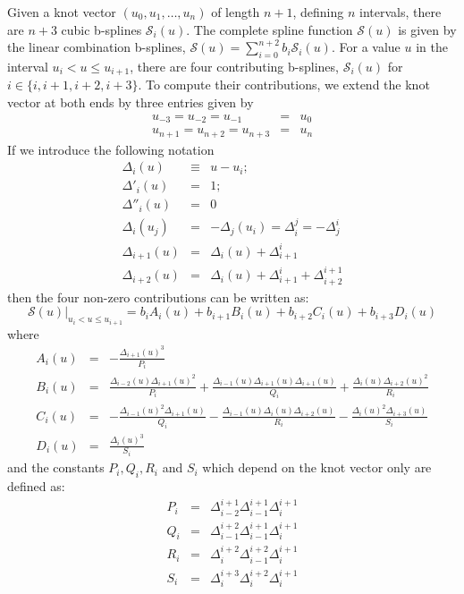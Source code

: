 \documentclass[a4paper,10pt,twosided]{article}
\begin{document}
Given a knot vector $(u_0,u_1,\dots,u_n)$ of length $n+1$, defining $n$ intervals, there are $n+3$ cubic b-splines $\mathcal{S}_i(u)$.
The complete spline function $\mathcal{S}(u)$ is given by the linear combination b-splines, $\mathcal{S}(u)= \sum_{i=0}^{n+2} b_i  \mathcal{S}_i(u)$.
For a value $u$ in the interval $u_{i}<  u\le u_{i+1}$, there are four contributing b-splines, $\mathcal{S}_i(u)$ for $i\in \{i,i+1,i+2,i+3\}$.
To compute their contributions, we extend the knot vector at both ends by three entries given by  
\begin{eqnarray*}
   u_{-3}=u_{-2}=u_{-1}&=&u_0
\\ u_{n+1}=u_{n+2}=u_{n+3}&=&u_n
\end{eqnarray*}
If we introduce the following notation
\begin{eqnarray*}
       \Delta_i(u) &\equiv& u-u_i;
   \\  \Delta'_i(u) &=& 1;
   \\  \Delta''_i(u)&=&0
   \\  \Delta_{i}(u_j) &=& -\Delta_j(u_i) = \Delta_i^j = -\Delta_j^i
   \\  \Delta_{i+1}(u) &=& \Delta_i(u)+\Delta_{i+1}^i
   \\  \Delta_{i+2}(u) &=& \Delta_i(u)+\Delta_{i+1}^i +\Delta_{i+2}^{i+1} 
\end{eqnarray*}
then the  four non-zero contributions can be written as:
\begin{equation}
   \left. \mathcal{S}(u)\right|_{u_i<u\le u_{i+1}} = b_i A_i(u) + b_{i+1} B_i(u) + b_{i+2} C_i(u) + b_{i+3} D_i(u)
\end{equation}
where
\begin{eqnarray*}
     A_i(u) &=& -\frac{\Delta_{i+1}(u)^3}{P_i}  
\\   B_i(u) &=&  \frac{\Delta_{i-2}(u)\Delta_{i+1}(u)^2 }{P_i} + \frac{ \Delta_{i-1}(u)\Delta_{i+1}(u)\Delta_{i+1}(u) }{Q_i} + \frac{ \Delta_i(u)\Delta_{i+2}(u)^2 }{R_i}
\\   C_i(u) &=& -\frac{\Delta_{i-1}(u)^2\Delta_{i+1}(u) }{Q_i} - \frac{ \Delta_{i-1}(u)\Delta_i(u)\Delta_{i+2}(u) }{R_i} - \frac{ \Delta_i(u)^2\Delta_{i+3}(u) }{S_i}
\\   D_i(u) &=&  \frac{\Delta_i(u)^3 }{S_i}
\end{eqnarray*}
and the constants $P_i,Q_i,R_i$ and $S_i$ which depend on the knot vector only are defined as:
\begin{eqnarray*}
    P_i &=&\Delta_{i-2}^{i+1}\Delta_{i-1}^{i+1}\Delta_i^{i+1}
\\  Q_i &=&\Delta_{i-1}^{i+2}\Delta_{i-1}^{i+1}\Delta_i^{i+1}
\\  R_i &=&\Delta_i^{i+2}\Delta_{i-1}^{i+2}\Delta_i^{i+1}
\\  S_i &=&\Delta_i^{i+3}\Delta_i^{i+2}\Delta_i^{i+1}
\end{eqnarray*}
\end{document}
